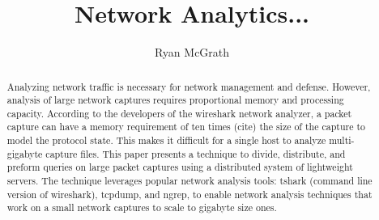 \documentclass{article}
\begin{document}
\title{Network Analytics...}
\author{Ryan McGrath}
\maketitle

\begin{abstract}

Analyzing network traffic is necessary for network management and defense. However, analysis of large network captures requires proportional memory and processing capacity. According to the developers of the wireshark network analyzer, a packet capture can have a memory requirement of ten times (cite) the size of the capture to model the protocol state.  This makes it difficult for a single host to analyze multi-gigabyte capture files.  This paper presents a technique to divide, distribute, and preform queries on large packet captures using a distributed system of lightweight servers. The technique leverages popular network analysis tools: tshark (command line version of wireshark), tcpdump, and ngrep, to enable network analysis techniques that work on a small network captures to scale to gigabyte size ones.   


\end{abstract}
\end{document}
